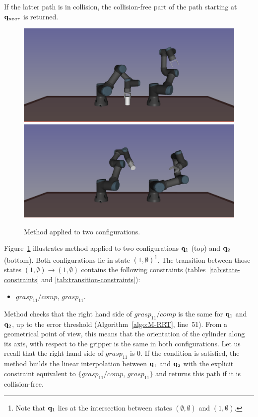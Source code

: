If the latter path is in collision, the collision-free part of the path starting
at $\mathbf{q}_{near}$ is returned.

\begin{figure}
  \begin{center}
    \includegraphics[width=.75\linewidth]{figures/example-qtarget-1.png}
    \includegraphics[width=.75\linewidth]{figures/example-connect-q1.png}
  \end{center}
  \caption{Method \CONNECT applied to two configurations.}
  \label{fig:connect}
\end{figure}

Figure~\ref{fig:connect} illustrates method \CONNECT applied to two configurations $\mathbf{q}_1$ (top) and $\mathbf{q}_2$ (bottom). Both configurations lie in state $(1,\emptyset)$\footnote{Note that $\mathbf{q}_1$ lies at the intersection between states
  $(\emptyset,\emptyset)$ and $(1,\emptyset)$.}. The transition between those states $(1,\emptyset)\rightarrow(1,\emptyset)$ contains the following constraints (tables~\ref{tab:state-constraints} and \ref{tab:transition-constraints}):
\begin{itemize}
\item $grasp_{11}/comp$, $grasp_{11}$.
\end{itemize}
Method \CONNECT checks that the right hand side of $grasp_{11}/comp$ is the same
for $\mathbf{q}_1$ and $\mathbf{q}_2$, up to the error threshold (Algorithm~\ref{algo:M-RRT}, line~51). From a geometrical point of view, this means that the orientation of the cylinder along its axis, with respect to the gripper is the same in both configurations. Let us recall that the right hand side of $grasp_{11}$ is 0. If the condition is satisfied, the method builds the linear interpolation between $\mathbf{q}_1$ and $\mathbf{q}_2$ with the explicit constraint equivalent to $\{grasp_{11}/comp$, $grasp_{11}\}$ and returns this path if it is collision-free.

